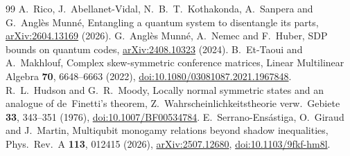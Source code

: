 \documentclass[11pt]{article}
\numberwithin{equation}{section}
\begin{document}
\begin{thebibliography}{99}
 A.~Rico, J.~Abellanet-Vidal, N.~B.~T.~Kothakonda, A.~Sanpera and G.~Angl\`es Munn\'e,
Entangling a quantum system to disentangle its parts,
\href{https://arxiv.org/abs/2604.13169}{arXiv:2604.13169} (2026).
 G.~Angl\`es Munn\'e, A.~Nemec and F.~Huber, SDP bounds on quantum codes,
\href{https://arxiv.org/abs/2408.10323}{arXiv:2408.10323} (2024).
 B.~Et-Taoui and A.~Makhlouf, Complex skew-symmetric conference matrices,
Linear Multilinear Algebra \textbf{70}, 6648--6663 (2022),
\href{https://doi.org/10.1080/03081087.2021.1967848}{doi:10.1080/03081087.2021.1967848}.
 R.~L.~Hudson and G.~R.~Moody, Locally normal symmetric states and an analogue of de~Finetti's theorem,
Z.\ Wahrscheinlichkeitstheorie verw.\ Gebiete \textbf{33}, 343--351 (1976), \href{https://doi.org/10.1007/BF00534784}{doi:10.1007/BF00534784}.
 E.~Serrano-Ens\'astiga, O.~Giraud and J.~Martin, Multiqubit monogamy relations beyond shadow inequalities,
Phys.\ Rev.\ A \textbf{113}, 012415 (2026), \href{https://arxiv.org/abs/2507.12680}{arXiv:2507.12680}, \href{https://doi.org/10.1103/9fkf-hm8l}{doi:10.1103/9fkf-hm8l}.
\end{thebibliography}
\end{document}
